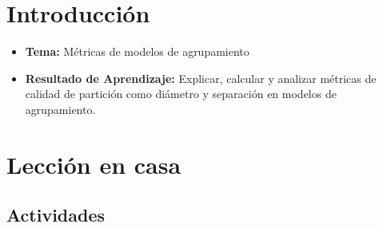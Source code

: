 \documentclass[a4,11pt]{aleph-notas}
\begin{document}
\encabezado

\section*{Introducción}

\begin{itemize}
    \item \textbf{Tema:} Métricas de modelos de agrupamiento
    \item \textbf{Resultado de Aprendizaje:} Explicar, calcular y analizar métricas de calidad de partición como diámetro y separación en modelos de agrupamiento.
\end{itemize}

\section*{Lección en casa}

\subsection*{Actividades}
\end{document}
